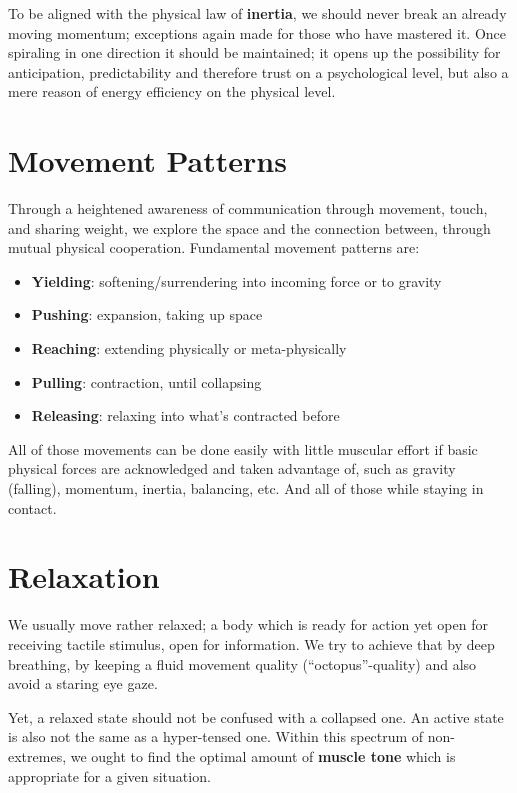 To be aligned with the physical law of \textbf{inertia}, we should never break an already moving momentum; exceptions again made for those who have mastered it.
Once spiraling in one direction it should be maintained; it opens up the possibility for anticipation, predictability and therefore trust on a psychological level, but also a mere reason of energy efficiency on the physical level.

\section{Movement Patterns}\label{sec:movement-patterns}

Through a heightened awareness of communication through movement, touch, and sharing weight, we explore the space and the connection between, through mutual physical cooperation.
Fundamental movement patterns are:

\begin{itemize}
    \setlength\itemsep{0em}
    \item [] \textbf{Yielding}: softening/surrendering into incoming force or to gravity
    \item [] \textbf{Pushing}: expansion, taking up space
    \item [] \textbf{Reaching}: extending physically or meta-physically
    \item [] \textbf{Pulling}: contraction, until collapsing
    \item [] \textbf{Releasing}: relaxing into what's contracted before
\end{itemize}

All of those movements can be done easily with little muscular effort if basic physical forces are acknowledged and taken advantage of, such as gravity (falling), momentum, inertia, balancing, etc.
And all of those while staying in contact.

\section{Relaxation}\label{sec:relaxation}

We usually move rather relaxed; a body which is ready for action yet open for receiving tactile stimulus, open for information.
We try to achieve that by deep breathing, by keeping a fluid movement quality (``octopus''-quality) and also avoid a staring eye gaze.

Yet, a relaxed state should not be confused with a collapsed one.
An active state is also not the same as a hyper-tensed one.
Within this spectrum of non-extremes, we ought to find the optimal amount of \textbf{muscle tone} which is appropriate for a given situation.


